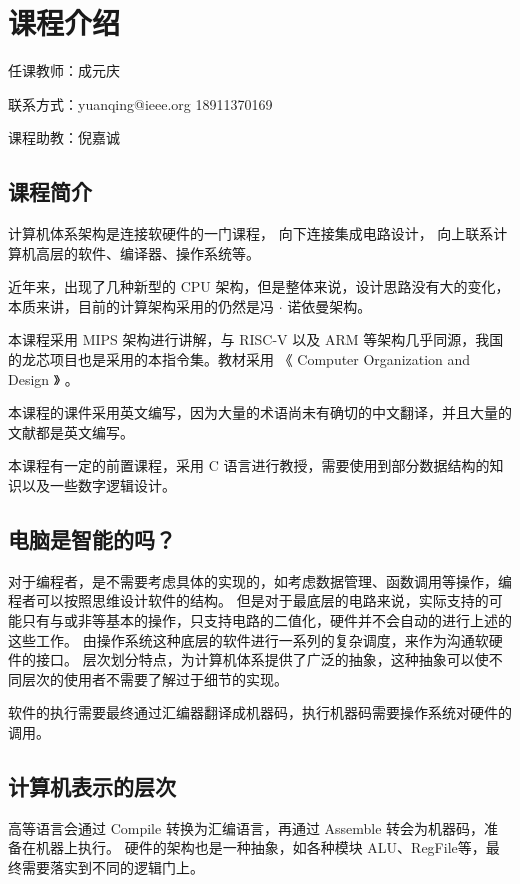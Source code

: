 \documentclass[cn,11pt,chinese,black,simple]{../elegantbook}
\begin{document}
\fi 
\def\chapname{00intro}

\chapter{课程介绍}

任课教师：成元庆

联系方式：yuanqing@ieee.org 18911370169

课程助教：倪嘉诚

\section{课程简介}

计算机体系架构是连接软硬件的一门课程，
向下连接集成电路设计，
向上联系计算机高层的软件、编译器、操作系统等。

近年来，出现了几种新型的 CPU 架构，但是整体来说，设计思路没有大的变化，本质来讲，目前的计算架构采用的仍然是冯 \(\cdot\) 诺依曼架构。

本课程采用 MIPS 架构进行讲解，与 RISC-V 以及 ARM 等架构几乎同源，我国的龙芯项目也是采用的本指令集。教材采用 《 Computer Organization and Design 》 。

本课程的课件采用英文编写，因为大量的术语尚未有确切的中文翻译，并且大量的文献都是英文编写。


本课程有一定的前置课程，采用 C 语言进行教授，需要使用到部分数据结构的知识以及一些数字逻辑设计。


\section{电脑是智能的吗？}

对于编程者，是不需要考虑具体的实现的，如考虑数据管理、函数调用等操作，编程者可以按照思维设计软件的结构。
但是对于最底层的电路来说，实际支持的可能只有与或非等基本的操作，只支持电路的二值化，硬件并不会自动的进行上述的这些工作。
由操作系统这种底层的软件进行一系列的复杂调度，来作为沟通软硬件的接口。
层次划分特点，为计算机体系提供了广泛的抽象，这种抽象可以使不同层次的使用者不需要了解过于细节的实现。

软件的执行需要最终通过汇编器翻译成机器码，执行机器码需要操作系统对硬件的调用。

\section{计算机表示的层次}

高等语言会通过 Compile 转换为汇编语言，再通过 Assemble 转会为机器码，准备在机器上执行。
硬件的架构也是一种抽象，如各种模块 ALU、RegFile等，最终需要落实到不同的逻辑门上。
\end{document}
